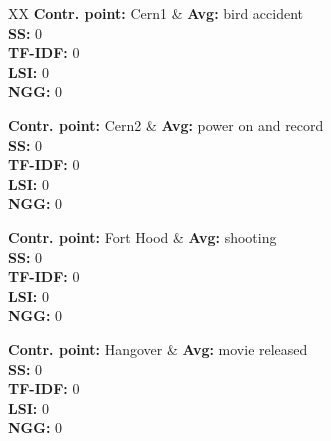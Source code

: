 \begin{table*}[htbp]
	\centering
	\begin{tabularx}{\textwidth}{XX}
\hline
\textbf{Contr. point:} Cern1 & \textbf{Avg:} bird accident\\
{\textbf{SS:} 0}\\
{\textbf{TF-IDF:} 0}\\
{\textbf{LSI:} 0}\\
{\textbf{NGG:} 0}\\



\hline


\textbf{Contr. point:} Cern2 & \textbf{Avg:} power on and record \\
{\textbf{SS:} 0}\\
{\textbf{TF-IDF:} 0}\\
{\textbf{LSI:} 0}\\
{\textbf{NGG:} 0}\\



\hline

\textbf{Contr. point:} Fort Hood & \textbf{Avg:} shooting \\
{\textbf{SS:} 0}\\
{\textbf{TF-IDF:} 0}\\
{\textbf{LSI:} 0}\\
{\textbf{NGG:} 0}\\



\hline


\textbf{Contr. point:} Hangover & \textbf{Avg:} movie released \\
{\textbf{SS:} 0}\\
{\textbf{TF-IDF:} 0}\\
{\textbf{LSI:} 0}\\
{\textbf{NGG:} 0}\\




\end{tabularx}
\end{table*}

